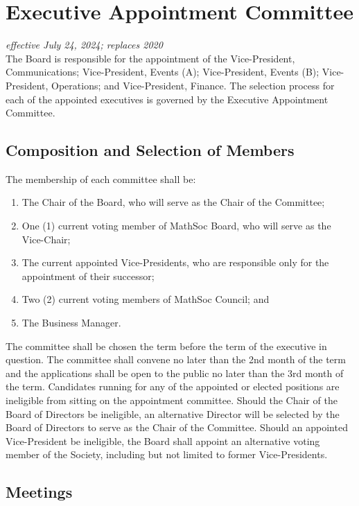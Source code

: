 \section{Executive Appointment Committee}
\emph{effective July 24, 2024; replaces 2020}\\

The Board is responsible for the appointment of the Vice-President, Communications; Vice-President, Events (A); Vice-President, Events (B); Vice-President, Operations; and Vice-President, Finance.
The selection process for each of the appointed executives is governed by the Executive Appointment Committee.

\subsection{Composition and Selection of Members}

The membership of each committee shall be:
\begin{enumerate}
	\item The Chair of the Board, who will serve as the Chair of the Committee;
	\item One (1) current voting member of MathSoc Board, who will serve as the Vice-Chair;
	\item The current appointed Vice-Presidents, who are responsible only for the appointment of their successor;
	\item Two (2) current voting members of MathSoc Council; and
	\item The Business Manager.
\end{enumerate}

The committee shall be chosen the term before the term of the executive in question.
The committee shall convene no later than the 2nd month of the term and the applications shall be open to the public no later than the 3rd month of the term.
Candidates running for any of the appointed or elected positions are ineligible from sitting on the appointment committee.
Should the Chair of the Board of Directors be ineligible, an alternative Director will be selected by the Board of Directors to serve as the Chair of the Committee.
Should an appointed Vice-President be ineligible, the Board shall appoint an alternative voting member of the Society, including but not limited to former Vice-Presidents.

\subsection{Meetings}

